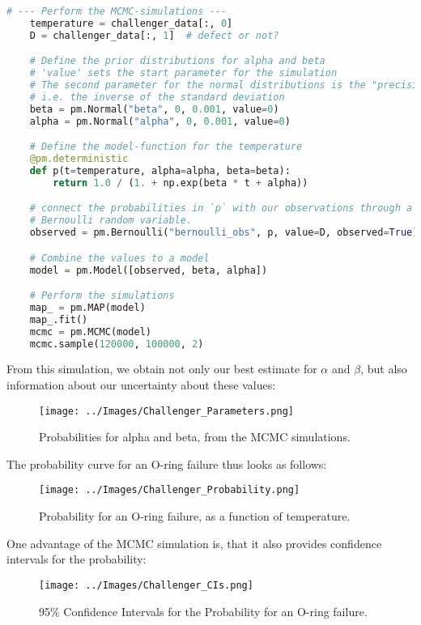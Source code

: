 \begin{lstlisting}[language=Python]
    # --- Perform the MCMC-simulations ---
    temperature = challenger_data[:, 0]
    D = challenger_data[:, 1]  # defect or not?

    # Define the prior distributions for alpha and beta
    # 'value' sets the start parameter for the simulation
    # The second parameter for the normal distributions is the "precision",
    # i.e. the inverse of the standard deviation
    beta = pm.Normal("beta", 0, 0.001, value=0)
    alpha = pm.Normal("alpha", 0, 0.001, value=0)

    # Define the model-function for the temperature
    @pm.deterministic
    def p(t=temperature, alpha=alpha, beta=beta):
        return 1.0 / (1. + np.exp(beta * t + alpha))

    # connect the probabilities in `p` with our observations through a
    # Bernoulli random variable.
    observed = pm.Bernoulli("bernoulli_obs", p, value=D, observed=True)

    # Combine the values to a model
    model = pm.Model([observed, beta, alpha])

    # Perform the simulations
    map_ = pm.MAP(model)
    map_.fit()
    mcmc = pm.MCMC(model)
    mcmc.sample(120000, 100000, 2)
\end{lstlisting}

From this simulation, we obtain not only our best estimate for $\alpha$ and $\beta$, but also information about our uncertainty about these values:

\begin{figure}[H]
  \centering
  \texttt{[image: ../Images/Challenger\_Parameters.png]}\\
  \caption{Probabilities for alpha and beta, from the MCMC simulations.}
\end{figure}

The probability curve for an O-ring failure thus looks as follows:

\begin{figure}[H]
  \centering
  \texttt{[image: ../Images/Challenger\_Probability.png]}\\
  \caption{Probability for an O-ring failure, as a function of temperature.}
\end{figure}

One advantage of the MCMC simulation is, that it also provides confidence intervals for the probability:

\begin{figure}[H]
  \centering
  \texttt{[image: ../Images/Challenger\_CIs.png]}\\
  \caption{95\% Confidence Intervals for the Probability for an O-ring failure.}
\end{figure}

